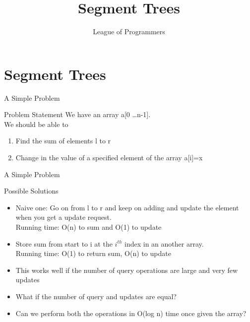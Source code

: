 \documentclass{beamer}
\title{Segment Trees
}
\author{League of Programmers}
\institute{ACA, IIT Kanpur}
\date
\begin{document}
\begin{frame}
  \titlepage
\end{frame}

\section{Segment Trees}
\begin{frame}[<+->]{A Simple Problem}
\begin{block}{Problem Statement}
    We have an array a[0 \dots n-1].\\\pause
    We should be able to
    \begin{enumerate}
	\item Find the sum of elements l to r
	\item Change in the value of a specified element of the array a[i]=x
    \end{enumerate}
\end{block}
\end{frame}

\begin{frame}[<+->]{A Simple Problem}
\begin{block}{Possible Solutions}
    \begin{itemize}
	\item Naive one: Go on from l to r and keep on adding and update the element when you get a update request.\\
	Running time: O(n) to sum and O(1) to update
	\item Store sum from start to i at the $i^{th}$ index in an another array.\\
	Running time: O(1) to return sum, O(n) to update
	\item This works well if the number of query operations are large and very few updates
	\item What if the number of query and updates are equal?
	\item Can we perform both the operations in O(log n) time once given the array?
    \end{itemize}
\end{block}
\end{frame}
\end{document}
